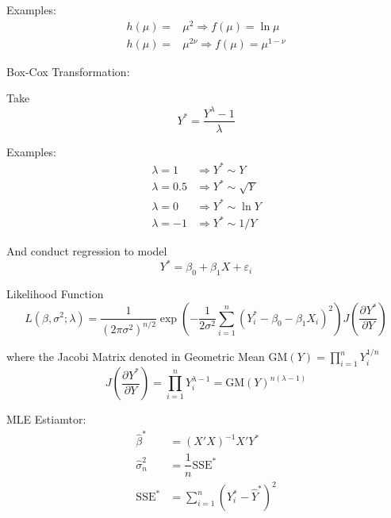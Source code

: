                 Examples:
                \begin{align}
                    h(\mu)=&\mu^2\Rightarrow f(\mu )=\ln\mu\\
                    h(\mu)=&\mu^{2\nu}\Rightarrow f(\mu )=\mu ^{1-\nu}
                \end{align}
            
    \begin{point}
        Box-Cox Transformation:
    \end{point}
    
        Take 
        \begin{equation}
            Y^*=\dfrac{Y^\lambda -1}{\lambda }
        \end{equation}
    
                Examples:
            \begin{align}
                \lambda =1&\Rightarrow Y^*\sim Y\\
                \lambda =0.5&\Rightarrow Y^*\sim \sqrt{Y}\\
                \lambda =0&\Rightarrow Y^*\sim \ln Y\\
                \lambda =-1&\Rightarrow Y^*\sim 1/Y
            \end{align}
        
            And conduct regression to model
            \begin{equation}
                Y^* =\beta _0+\beta _1X+\varepsilon_i 
            \end{equation}
            
            Likelihood Function
            \begin{equation}
                L(\beta ,\sigma ^2;\lambda )=\dfrac{1}{(2\pi\sigma ^2)^{n/2}}\exp\left( -\dfrac{1}{2\sigma ^2}\sum_{i=1}^n (Y_i^*-\beta _0-\beta _1X_i)^2 \right) J(\dfrac{\partial^{} Y^*}{\partial Y^{}})
            \end{equation}
    
            where the Jacobi Matrix denoted in Geometric Mean $ \mathrm{GM}(Y)=\prod_{i=1}^n Y_i^{1/n}$
            \begin{equation}
                J(\dfrac{\partial^{} Y^*}{\partial Y^{}})=\prod_{i=1}^nY_i^{\lambda -1}=\mathrm{GM}(Y)^{n(\lambda -1)}
            \end{equation}
            
            
    
            MLE Estiamtor:
            \begin{align}
                \hat{\beta }^*&= (X'X)^{-1}X'Y^*\\
                \hat{\sigma }^2_n&=\dfrac{1}{n}\mathrm{SSE}^*\\
                \mathrm{SSE}^*&=\sum_{i=1}^n(Y_i^*-\hat{Y}^*)^2
            \end{align}
    
